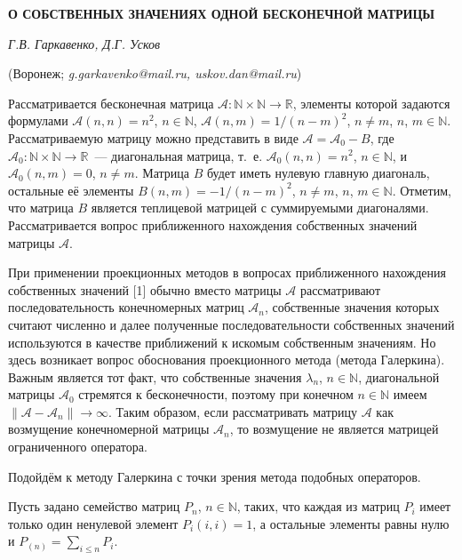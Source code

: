 \begin{center}
    {\bf О СОБСТВЕННЫХ ЗНАЧЕНИЯХ ОДНОЙ БЕСКОНЕЧНОЙ МАТРИЦЫ}

    {\it Г.В. Гаркавенко, Д.Г. Усков}

    (Воронеж; {\it g.garkavenko@mail.ru, uskov.dan@mail.ru})
\end{center}


Рассматривается бесконечная матрица $\mathcal{A}: \mathbb{N}\times\mathbb{N}\to\mathbb{R}$, элементы которой задаются
формулами $\mathcal{A}(n, n)=n^2$, $n\in\mathbb{N}$, $\mathcal{A}(n, m)=1/(n-m)^2$, $n\ne m$, $n$, $m\in\mathbb{N}$.
Рассматриваемую матрицу
можно представить в виде $\mathcal{A}=\mathcal{A}_0-B$, где $\mathcal{A}_0: \mathbb{N}\times\mathbb{N}\to\mathbb{R}$~---
диагональная матрица, т.~е. $\mathcal{A}_0(n, n)=n^2$, $n\in\mathbb{N}$, и $\mathcal{A}_0(n, m)=0$, $n\ne m$. Матрица
$B$ будет иметь нулевую главную диагональ, остальные её элементы $B(n, m)=-1/(n-m)^2$, $n\ne m$, $n$, $m\in\mathbb{N}$.
Отметим, что матрица $B$ является теплицевой матрицей с суммируемыми диагоналями. Рассматривается вопрос приближенного
нахождения собственных значений матрицы $\mathcal{A}$.

При применении проекционных методов в вопросах приближенного нахождения собственных значений [1] обычно вместо
матрицы $\mathcal{A}$ рассматривают последовательность конечномерных матриц $\mathcal{A}_n$, собственные значения которых \linebreak
считают численно и далее полученные последовательности собственных значений используются в качестве приближений к искомым
собственным значениям. Но здесь возникает вопрос обоснования проекционного метода (метода Галеркина). Важным является тот факт, что
собственные значения $\lambda_n$, $n\in\mathbb{N}$, диагональной матрицы $\mathcal{A}_0$ стремятся к бесконечности, поэтому
при конечном $n\in\mathbb{N}$ имеем $\|\mathcal{A}-\mathcal{A}_n\|\to\infty$. Таким образом, если рассматривать матрицу $\mathcal{A}$
как возмущение конечномерной матрицы $\mathcal{A}_n$, то возмущение не является матрицей ограниченного оператора.

Подойдём к методу Галеркина с точки зрения метода подобных операторов.

Пусть задано семейство матриц $P_n$, $n\in\mathbb{N}$, таких, что каждая из матриц $P_i$ имеет только один ненулевой элемент
$P_i(i, i)=1$, а остальные элементы равны нулю и $P_{(n)}=\sum_{i\leqslant n}P_i$.

